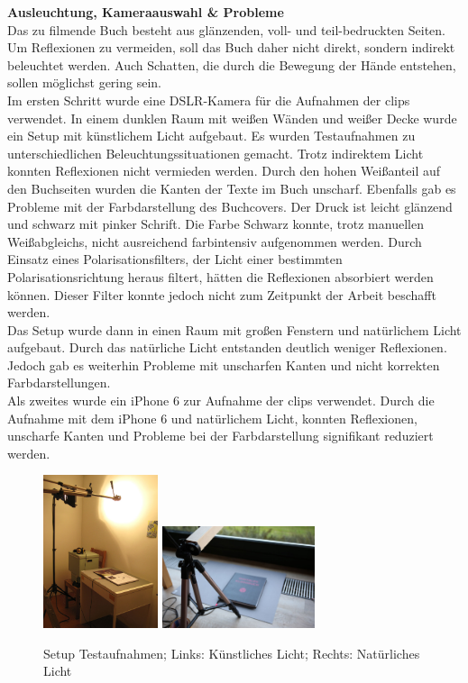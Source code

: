 \textbf{Ausleuchtung, Kameraauswahl \& Probleme}\\
Das zu filmende Buch besteht aus glänzenden, voll- und teil-bedruckten Seiten. Um Reflexionen zu vermeiden, soll das Buch daher nicht direkt, sondern indirekt beleuchtet werden. Auch Schatten, die durch die Bewegung der Hände entstehen, sollen möglichst gering sein.\\

Im ersten Schritt wurde eine DSLR-Kamera für die Aufnahmen der \gls{clip}s verwendet. In einem dunklen Raum mit weißen Wänden und weißer Decke wurde ein Setup mit künstlichem Licht aufgebaut. Es wurden Testaufnahmen zu unterschiedlichen Beleuchtungssituationen gemacht. Trotz indirektem Licht konnten Reflexionen nicht vermieden werden. Durch den hohen Weißanteil auf den Buchseiten wurden die Kanten der Texte im Buch unscharf. Ebenfalls gab es Probleme mit der Farbdarstellung des Buchcovers. Der Druck ist leicht glänzend und schwarz mit pinker Schrift. Die Farbe Schwarz konnte, trotz manuellen Weißabgleichs, nicht ausreichend farbintensiv aufgenommen werden. Durch Einsatz eines Polarisationsfilters, der Licht einer bestimmten Polarisationsrichtung heraus filtert, hätten die Reflexionen absorbiert werden können. Dieser Filter konnte jedoch nicht zum Zeitpunkt der Arbeit beschafft werden.\\
Das Setup wurde dann in einen Raum mit großen Fenstern und natürlichem Licht aufgebaut. Durch das natürliche Licht entstanden deutlich weniger Reflexionen. Jedoch gab es weiterhin Probleme mit unscharfen Kanten und nicht korrekten Farbdarstellungen.\\
Als zweites wurde ein iPhone 6 zur Aufnahme der \gls{clip}s verwendet. Durch die Aufnahme mit dem iPhone 6 und natürlichem Licht, konnten Reflexionen, unscharfe Kanten und Probleme bei der Farbdarstellung signifikant reduziert werden.



\begin{figure}[H]
\centering
\includegraphics[width=0.3\textwidth]{grafiken/testaufnahmen.jpg}
\includegraphics[width=0.4\textwidth]{grafiken/setupII.jpg}
\caption{Setup Testaufnahmen; Links: Künstliches Licht; Rechts: Natürliches Licht}
\end{figure}



